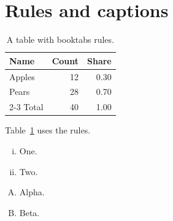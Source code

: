 \documentclass{article}
\begin{document}
\section{Rules and captions}
\begin{table}[h]
\centering
\caption{A table with booktabs rules.}
\label{tab:one}
\begin{tabular}{lrr}
\toprule
Name & Count & Share\\
\midrule
Apples & 12 & 0.30\\
Pears & 28 & 0.70\\
\cmidrule(lr){2-3}
Total & 40 & 1.00\\
\bottomrule
\end{tabular}
\end{table}
Table~\ref{tab:one} uses the rules.
\begin{enumerate}[(i)]
\item One.
\item Two.
\end{enumerate}
\begin{enumerate}[A.]
\item Alpha.
\item Beta.
\end{enumerate}
\end{document}
